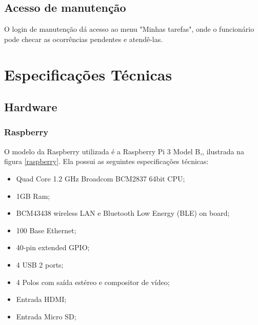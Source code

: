 \documentclass[
	12pt,				%
	openright,			%
	oneside,			%
	a4paper,			%
	english,			%
	french,				%
	spanish,			%
	brazil				%
	]{abntex2}
\begin{document}
\section{Acesso de manutenção}

O login de manutenção dá acesso ao menu "Minhas tarefas", onde o funcionário pode checar as ocorrências pendentes e atendê-las. 



\chapter{Especificações Técnicas}

\section{Hardware}

\subsection{Raspberry}

O modelo da Raspberry utilizada é a Raspberry Pi 3 Model B,, ilustrada na figura \ref{raspberry}. Ela possui as seguintes especificações técnicas:\cite{siteraspberry}

\begin{itemize}
	\item Quad Core 1.2 GHz Broadcom BCM2837 64bit CPU;
	\item 1GB Ram;
	\item BCM43438 wireless LAN e Bluetooth Low Energy (BLE) on board;
	\item 100 Base Ethernet;
	\item 40-pin extended GPIO;
	\item 4 USB 2 ports;
	\item 4 Polos com saída estéreo e compositor de vídeo;
	\item Entrada HDMI;
	\item Entrada Micro SD;
\end{itemize}

\end{document}
